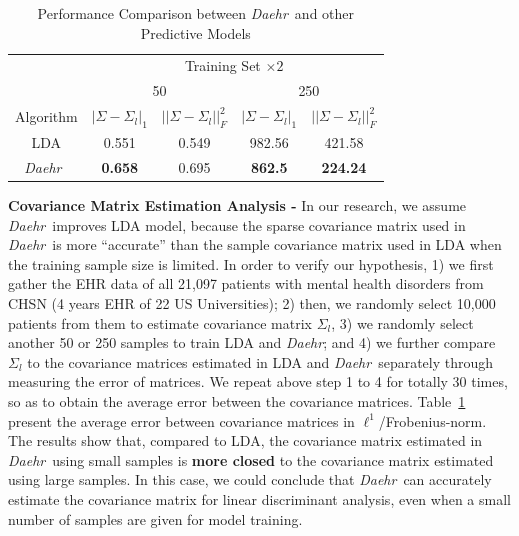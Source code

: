 \documentclass[journal,compsoc]{IEEEtran}
\newcommand{\TheName}{\mbox{\emph{Daehr}}}
\begin{document}
\begin{table}
\footnotesize{
\begin{center}
\caption{Performance Comparison between \TheName\ and other Predictive Models}
		\label{tab:matrix-error}
\begin{tabular}{*{5}{c}}
\toprule
    &  \multicolumn{4}{c}{Training Set $ \times 2$}\\
    \cmidrule(lr){2-5}
    &  
    \multicolumn{2}{c}{50} &
    \multicolumn{2}{c}{250} \\
\cmidrule(lr){2-3}
\cmidrule(lr){4-5}
Algorithm & $|\Sigma-\Sigma_{l}|_1$ & $||\Sigma-\Sigma_{l}||_F^2$ & $|\Sigma-\Sigma_{l}|_1$ & $||\Sigma-\Sigma_{l}||_F^2$  \\
 \cmidrule(lr){1-1}                        
 \cmidrule(lr){2-3}
\cmidrule(lr){4-5}
    LDA &   0.551 & 0.549  &     982.56 & 421.58  \\

     \cmidrule(lr){1-1}                        
 \cmidrule(lr){2-3}
\cmidrule(lr){4-5}

     \TheName\ &  \textbf{0.658} & 0.695  &     \textbf{862.5} & \textbf{224.24}      \\

     \bottomrule

\end{tabular}

\end{center}
}
\end{table}



\textbf{Covariance Matrix Estimation Analysis - } In our research, we assume \TheName\ improves LDA model, because the sparse covariance matrix used in \TheName\ is more ``accurate'' than the sample covariance matrix used in LDA when the training sample size is limited. In order to verify our hypothesis, 1) we first gather the EHR data of all 21,097 patients with mental health disorders from CHSN (4 years EHR of 22 US Universities); 2) then, we randomly select 10,000 patients from them to estimate covariance matrix $\Sigma_l$, 3) we randomly select another 50 or 250 samples to train LDA and \TheName; and 4) we further compare $\Sigma_l$ to the covariance matrices estimated in LDA and \TheName\ separately through measuring the error of matrices. We repeat above step 1 to 4 for totally 30 times, so as to obtain the average error between the covariance matrices. Table~\ref{tab:matrix-error} present the average error between covariance matrices in $\ell^1$/Frobenius-norm. 
%
The results show that, compared to LDA, the covariance matrix estimated in \TheName\ using small samples is \textbf{more closed} to the covariance matrix estimated using large samples. In this case, we could conclude that \TheName\ can accurately estimate the covariance matrix for linear discriminant analysis, even when a small number of samples are given for model training. 
\end{document}
